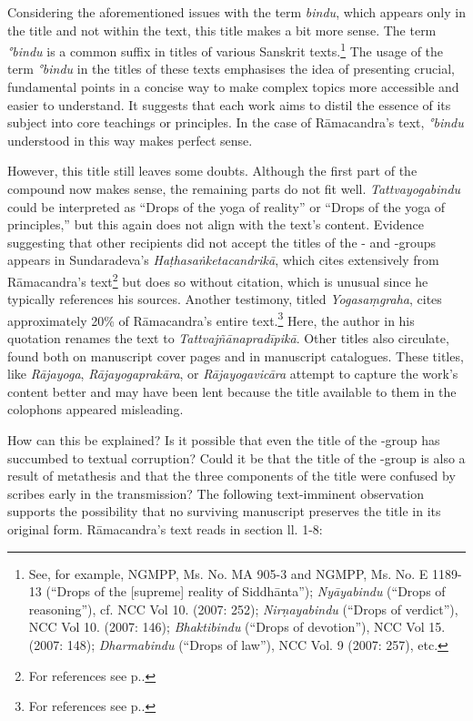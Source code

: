 Considering the aforementioned issues with the term \textit{bindu}, which appears only in the title and not within the text, this title makes a bit more sense. The term \textit{°bindu} is a common suffix in titles of various Sanskrit texts.\footnote{See, for example, \nocite{stb2} NGMPP, Ms. No. MA 905-3 and NGMPP, Ms. No. E 1189-13 (``Drops of the [supreme] reality of Siddhānta''); \emph{Nyāyabindu} (``Drops of reasoning''), cf. \nocite{newcataloguscatalogorum10} NCC Vol 10. (2007: 252); \emph{Nirṇayabindu} (``Drops of verdict''), NCC Vol 10. (2007: 146); \emph{Bhaktibindu} (``Drops of devotion''), NCC Vol 15. (2007: 148); \emph{Dharmabindu} (``Drops of law''), NCC Vol. 9 (2007: 257), etc.\nocite{newcataloguscatalogorum9}\nocite{newcataloguscatalogorum15}} The usage of the term \textit{°bindu} in the titles of these texts emphasises the idea of presenting crucial, fundamental points in a concise way to make complex topics more accessible and easier to understand. It suggests that each work aims to distil the essence of its subject into core teachings or principles. In the case of Rāmacandra's text, \textit{°bindu} understood in this way makes perfect sense.     

However, this title still leaves some doubts. Although the first part of the compound now makes sense, the remaining parts do not fit well. \emph{Tattvayogabindu} could be interpreted as ``Drops of the yoga of reality'' or ``Drops of the yoga of principles,'' but this again does not align with the text's content. Evidence suggesting that other recipients did not accept the titles of the \alpha- and \beta-groups appears in Sundaradeva's \emph{Haṭhasaṅketacandrikā}, which cites extensively from Rāmacandra's text\footnote{For references see p.\pageref{hathacandrika}.} but does so without citation, which is unusual since he typically references his sources. Another testimony, titled \emph{Yogasaṃgraha}, cites approximately 20\% of Rāmacandra's entire text.\footnote{For references see p.\pageref{yogasamgraha}.} Here, the author in his quotation renames the text to \emph{Tattvajñānapradīpikā}. Other titles also circulate, found both on manuscript cover pages and in manuscript catalogues. These titles, like \emph{Rājayoga}, \emph{Rājayogaprakāra}, or \emph{Rājayogavicāra} attempt to capture the work's content better and may have been lent because the title available to them in the colophons appeared misleading. 

How can this be explained? Is it possible that even the title of the \alpha-group has succumbed to textual corruption? Could it be that the title of the \alpha-group is also a result of metathesis and that the three components of the title were confused by scribes early in the transmission? The following text-imminent observation supports the possibility that no surviving manuscript preserves the title in its original form. Rāmacandra's text reads in section  ll. 1-8:

